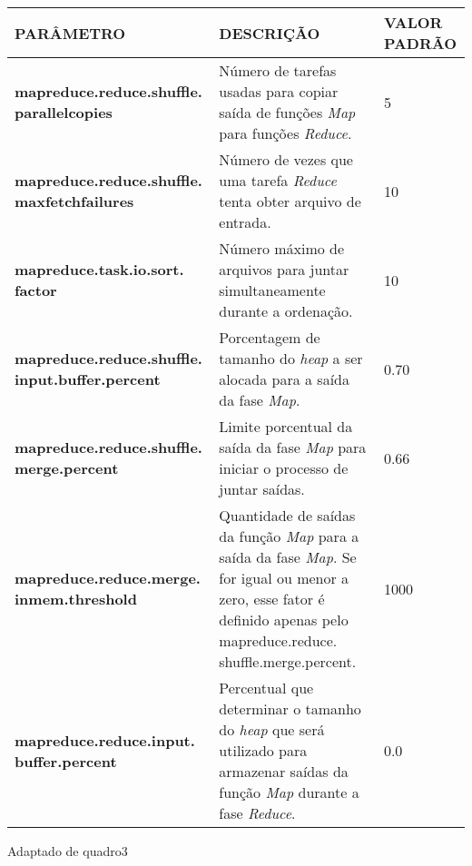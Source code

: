{\footnotesize
  \centering
  \begin{tabular}{|p{40mm}|p{50mm}|p{30mm}|}\hline
    \textbf{PARÂMETRO}                                       & \textbf{DESCRIÇÃO}                                                                                                                                                                      & \textbf{VALOR PADRÃO} \\\hline
    \textbf{mapreduce.reduce.shuffle. parallelcopies}        & Número de tarefas usadas para copiar saída de funções \textit{Map} para funções \textit{Reduce}.                                                                                        & 5                     \\\hline
    \textbf{mapreduce.reduce.shuffle. maxfetchfailures}      & Número de vezes que uma tarefa \textit{Reduce} tenta obter arquivo de entrada.                                                                                                          & 10                    \\\hline
    \textbf{mapreduce.task.io.sort. factor}                  & Número máximo de arquivos para juntar simultaneamente durante a ordenação.                                                                                                              & 10                    \\\hline
    \textbf{mapreduce.reduce.shuffle. input.buffer.percent} & Porcentagem de tamanho do \textit{heap} a ser alocada para a saída da fase \textit{Map}.                                                                                                & 0.70                  \\\hline
    \textbf{mapreduce.reduce.shuffle. merge.percent}         & Limite porcentual da saída da fase \textit{Map} para iniciar o processo de juntar saídas.                                                                                               & 0.66                  \\\hline
    \textbf{mapreduce.reduce.merge. inmem.threshold}         & Quantidade de saídas da função \textit{Map} para a saída da fase \textit{Map}. Se for igual ou menor a zero, esse fator é definido apenas pelo mapreduce.reduce. shuffle.merge.percent. & 1000                  \\\hline
    \textbf{mapreduce.reduce.input. buffer.percent}          & Percentual que determinar o tamanho do \textit{heap} que será utilizado para armazenar saídas da função \textit{Map} durante a fase \textit{Reduce}.                                    & 0.0                   \\\hline
  \end{tabular}}
{Adaptado de \cite{HadoopBook15}}{quadro3}{}{}

